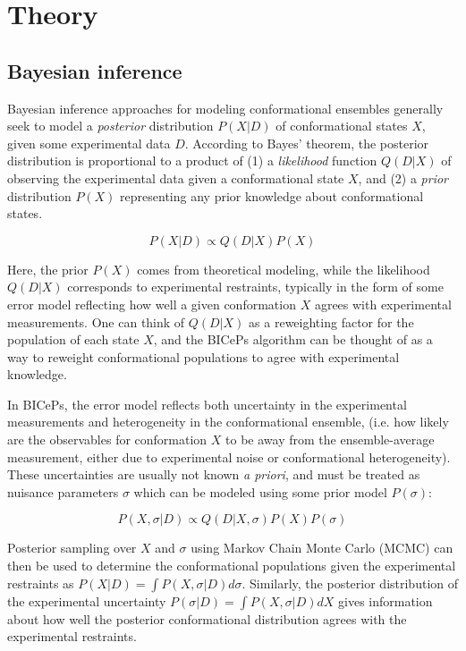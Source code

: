 \hypertarget{theory}{%
\section{Theory}\label{theory}}

\hypertarget{bayesian-inference}{%
\subsection{Bayesian inference}\label{bayesian-inference}}

Bayesian inference approaches for modeling conformational ensembles
generally seek to model a \emph{posterior} distribution \(P(X|D)\) of
conformational states \(X\), given some experimental data \(D\).
According to Bayes' theorem, the posterior distribution is proportional
to a product of (1) a \emph{likelihood} function \(Q(D|X)\) of observing
the experimental data given a conformational state \(X\), and (2) a
\emph{prior} distribution \(P(X)\) representing any prior knowledge
about conformational states.

\[P(X|D) \propto Q(D|X) P(X)\]

Here, the prior \(P(X)\) comes from theoretical modeling, while the
likelihood \(Q(D|X)\) corresponds to experimental restraints, typically
in the form of some error model reflecting how well a given conformation
\(X\) agrees with experimental measurements. One can think of \(Q(D|X)\)
as a reweighting factor for the population of each state \(X\), and the
BICePs algorithm can be thought of as a way to reweight conformational
populations to agree with experimental knowledge.

In BICePs, the error model reflects both uncertainty in the experimental
measurements and heterogeneity in the conformational ensemble, (i.e. how
likely are the observables for conformation \(X\) to be away from the
ensemble-average measurement, either due to experimental noise or
conformational heterogeneity). These uncertainties are usually not known
\emph{a priori}, and must be treated as nuisance parameters \(\sigma\)
which can be modeled using some prior model \(P(\sigma)\):

\[P(X,\sigma | D) \propto Q(D|X,\sigma) P(X) P(\sigma)\]

Posterior sampling over \(X\) and \(\sigma\) using Markov Chain Monte
Carlo (MCMC) can then be used to determine the conformational
populations given the experimental restraints as
\(P(X|D) = \int P(X,\sigma | D) d\sigma\). Similarly, the posterior
distribution of the experimental uncertainty
\(P(\sigma | D) = \int P(X,\sigma | D) dX\) gives information about how
well the posterior conformational distribution agrees with the
experimental restraints.

